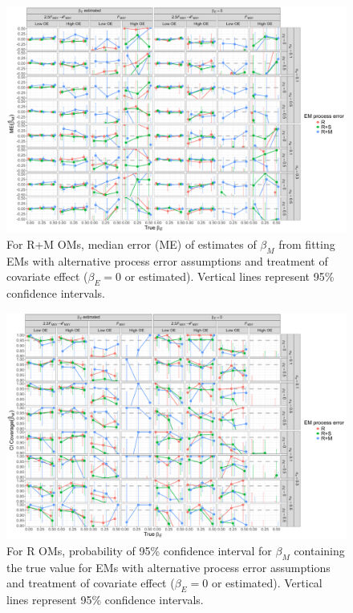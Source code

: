 \documentclass[
  12pt,
]{article}
\begin{document}
\begin{landscape}
\begin{figure}
\begin{center}
\includegraphics[height = \textheight]{beta_M_bias_RMom}
\end{center}
\caption{For R+M OMs, median error (ME) of estimates of $\beta_M$ from fitting EMs with alternative process error assumptions and treatment of covariate effect ($\beta_E = 0$ or estimated). Vertical lines represent 95\% confidence intervals.}\label{beta_M_bias_RMom}
\end{figure}
\end{landscape}

\begin{landscape}
\begin{figure}
\begin{center}
\includegraphics[height = \textheight]{beta_M_CI_coverage_Rom}
\end{center}
\caption{For R OMs, probability of 95\% confidence interval for $\beta_M$ containing the true value for EMs with alternative process error assumptions and treatment of covariate effect ($\beta_E = 0$ or estimated). Vertical lines represent 95\% confidence intervals.}\label{beta_M_CI_coverage_Rom}
\end{figure}
\end{landscape}
\end{document}
